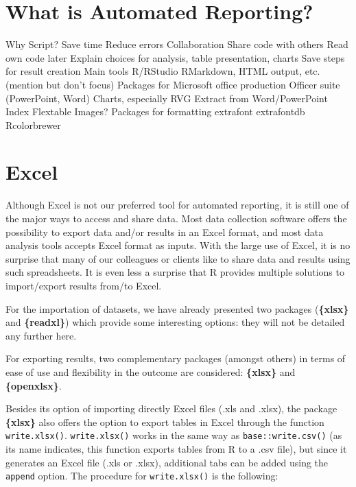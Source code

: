 \documentclass[
]{book}
\begin{document}
\hypertarget{what-is-automated-reporting}{%
\section{What is Automated Reporting?}\label{what-is-automated-reporting}}

Why Script?
Save time
Reduce errors
Collaboration
Share code with others
Read own code later
Explain choices for analysis, table presentation, charts
Save steps for result creation
Main tools
R/RStudio
RMarkdown, HTML output, etc. (mention but don't focus)
Packages for Microsoft office production
Officer suite (PowerPoint, Word)
Charts, especially RVG
Extract from Word/PowerPoint
Index
Flextable
Images?
Packages for formatting
extrafont
extrafontdb
Rcolorbrewer

\hypertarget{excel}{%
\section{Excel}\label{excel}}

Although Excel is not our preferred tool for automated reporting, it is still one of the major ways to access and share data. Most data collection software offers the possibility to export data and/or results in an Excel format, and most data analysis tools accepts Excel format as inputs. With the large use of Excel, it is no surprise that many of our colleagues or clients like to share data and results using such spreadsheets. It is even less a surprise that R provides multiple solutions to import/export results from/to Excel.

For the importation of datasets, we have already presented two packages (\textbf{\{xlsx\}} and \textbf{\{readxl\}}) which provide some interesting options: they will not be detailed any further here.

For exporting results, two complementary packages (amongst others) in terms of ease of use and flexibility in the outcome are considered: \textbf{\{xlsx\}} and \textbf{\{openxlsx\}}.

Besides its option of importing directly Excel files (.xls and .xlsx), the package \textbf{\{xlsx\}} also offers the option to export tables in Excel through the function \texttt{write.xlsx()}. \texttt{write.xlsx()} works in the same way as \texttt{base::write.csv()} (as its name indicates, this function exports tables from R to a .csv file), but since it generates an Excel file (.xls or .xlsx), additional tabs can be added using the \texttt{append} option. The procedure for \texttt{write.xlsx()} is the following:
\end{document}
